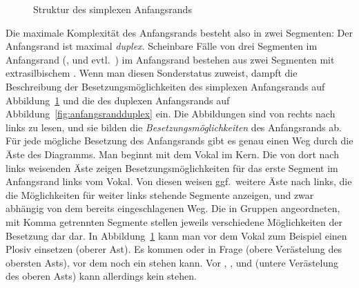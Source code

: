\begin{figure}
  \centering
  \caption{Struktur des simplexen Anfangsrands}
  \label{fig:anfangsrandsimplex}
\end{figure}

Die maximale Komplexität des Anfangsrands besteht also in zwei Segmenten:
Der Anfangsrand ist maximal \textit{duplex}.
Scheinbare Fälle von drei Segmenten im Anfangsrand (\textipa{[SpK]}, \textipa{[StK]} und evtl.\ \textipa{[Spl]}) im Anfangsrand bestehen aus zwei Segmenten mit extrasilbischem \textipa{[S]}.
Wenn man \textipa{[S]} diesen Sonderstatus zuweist, dampft die Beschreibung der Besetzungsmöglichkeiten des simplexen Anfangsrands auf Abbildung~\ref{fig:anfangsrandsimplex} und die des duplexen Anfangsrands auf Abbildung~\ref{fig:anfangsrandduplex} ein.
Die Abbildungen sind von rechts nach links zu lesen, und sie bilden die \textit{Besetzungsmöglichkeiten} des Anfangsrands ab.
Für jede mögliche Besetzung des Anfangsrands gibt es genau einen Weg durch die Äste des Diagramms.
Man beginnt mit dem Vokal im Kern.
Die von dort nach links weisenden Äste zeigen Besetzungsmöglichkeiten für das erste Segment im Anfangsrand links vom Vokal.
Von diesen weisen ggf.\ weitere Äste nach links, die die Möglichkeiten für weiter links stehende Segmente anzeigen, und zwar abhängig von dem bereits eingeschlagenen Weg.
Die in Gruppen angeordneten, mit Komma getrennten Segmente stellen jeweils verschiedene Möglichkeiten der Besetzung dar dar.
In Abbildung~\ref{fig:anfangsrandsimplex} kann man vor dem Vokal zum Beispiel einen Plosiv einsetzen (oberer Ast).
Es kommen \textipa{[p]} oder \textipa{[t]} in Frage (obere Verästelung des obersten Asts), vor dem noch ein \textipa{[S]} stehen kann.
Vor \textipa{[b]}, \textipa{[d]}, \textipa{[k]} und \textipa{[g]} (untere Verästelung des oberen Asts) kann allerdings kein \textipa{[S]} stehen.

